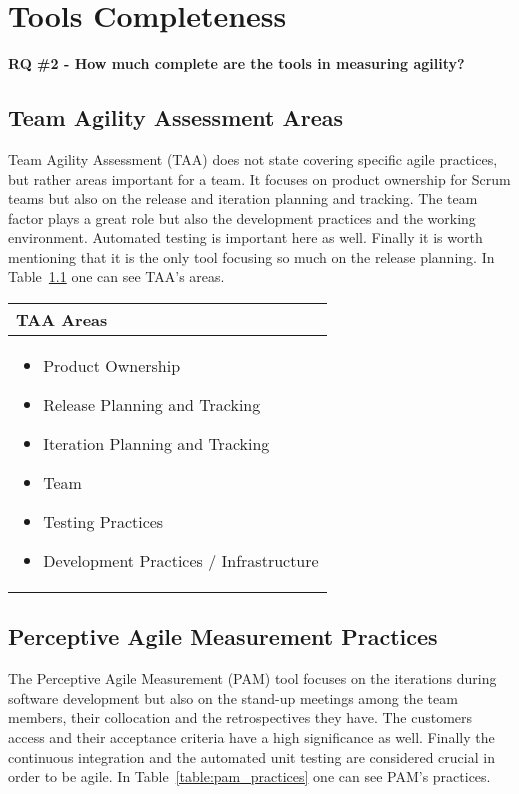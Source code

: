 \chapter{Tools Completeness}

\textbf{RQ \#2 - How much complete are the tools in measuring agility?}

\section{Team Agility Assessment Areas}
Team Agility Assessment (TAA) does not state covering specific agile practices, but rather areas important for a team. It focuses on product ownership for Scrum teams but also on the release and iteration planning and tracking. The team factor plays a great role but also the development practices and the working environment. Automated testing is important here as well. Finally it is worth mentioning that it is the only tool focusing so much on the release planning. In Table~\ref{table:taa_practices} one can see TAA's areas.

\begin{table} [H]
  \begin{tabular}{| p{6.8cm} |}
    \hline
     \textbf{TAA Areas}\\ \hline
     \begin{itemize} \item Product Ownership \item Release Planning and Tracking \item Iteration Planning and Tracking \item Team \item Testing Practices \item Development Practices / Infrastructure \end{itemize}  \\ \hline
  \end{tabular}
  \label{table:taa_practices}
\end{table}

\section{Perceptive Agile Measurement Practices}
The Perceptive Agile Measurement (PAM) tool focuses on the iterations during software development but also on the stand-up meetings among the team members, their collocation and the retrospectives they have. The customers access and their acceptance criteria have a high significance as well. Finally the continuous integration and the automated unit testing are considered crucial in order to be agile. In Table~\ref{table:pam_practices} one can see PAM's practices.

